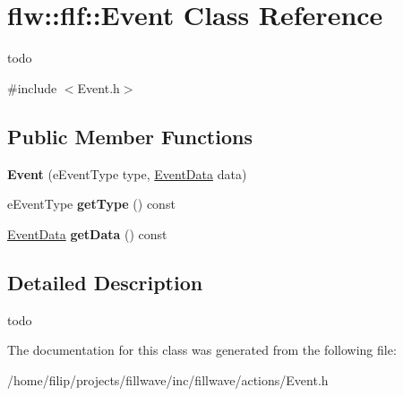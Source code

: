 \hypertarget{classflw_1_1flf_1_1Event}{}\section{flw\+:\+:flf\+:\+:Event Class Reference}
\label{classflw_1_1flf_1_1Event}


todo  




{\ttfamily \#include $<$Event.\+h$>$}

\subsection*{Public Member Functions}
\begin{DoxyCompactItemize}
\item 
\mbox{\label{classflw_1_1flf_1_1Event_aa5fef3c845d19e8397af8d5ae7c73a3d}} 
{\bfseries Event} (e\+Event\+Type type, \hyperlink{unionflw_1_1flf_1_1EventData}{Event\+Data} data)
\item 
\mbox{\label{classflw_1_1flf_1_1Event_aa16a20cb93f018f3c957d3a0e4fff56c}} 
e\+Event\+Type {\bfseries get\+Type} () const
\item 
\mbox{\label{classflw_1_1flf_1_1Event_afa0b759ce3d9ba70522c8ea6609a9b84}} 
\hyperlink{unionflw_1_1flf_1_1EventData}{Event\+Data} {\bfseries get\+Data} () const
\end{DoxyCompactItemize}


\subsection{Detailed Description}
todo 

The documentation for this class was generated from the following file\+:\begin{DoxyCompactItemize}
\item 
/home/filip/projects/fillwave/inc/fillwave/actions/Event.\+h\end{DoxyCompactItemize}
